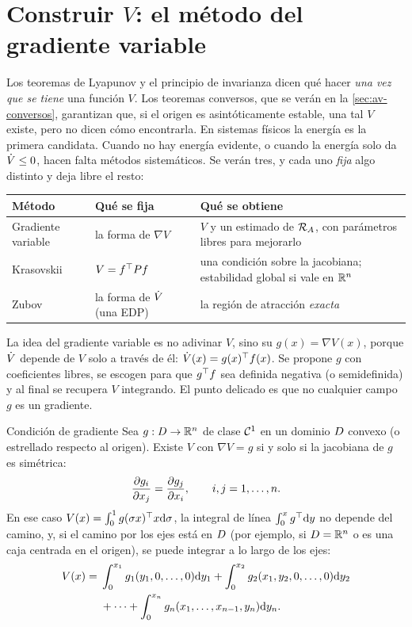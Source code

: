 \section{Construir $V$: el método del gradiente variable}
\label{sec:iv-gradiente}

Los teoremas de Lyapunov y el principio de invarianza dicen qué hacer \emph{una vez que se tiene} una función $V$. Los teoremas conversos, que se verán en la \cref{sec:av-conversos}, garantizan que, si el origen es asintóticamente estable, una tal $V$ existe, pero no dicen cómo encontrarla. En sistemas físicos la energía es la primera candidata. Cuando no hay energía evidente, o cuando la energía solo da $\dot V\le0$, hacen falta métodos sistemáticos. Se verán tres, y cada uno \emph{fija} algo distinto y deja libre el resto:

\begin{center}
\small
\begin{tabular}{@{}p{2.6cm}p{3.6cm}p{5.4cm}@{}}
\toprule
Método & Qué se fija & Qué se obtiene \\
\midrule
Gradiente variable & la forma de $\nabla V$ & $V$ y un estimado de $\mathcal{R}_A$, con parámetros libres para mejorarlo \\
Krasovskii & $V=f^{\top} Pf$ & una condición sobre la jacobiana; estabilidad global si vale en $\mathbb{R}^n$ \\
Zubov & la forma de $\dot V$ (una EDP) & la región de atracción \emph{exacta} \\
\bottomrule
\end{tabular}
\end{center}

La idea del gradiente variable es no adivinar $V$, sino su  $g(x)=\nabla V(x)$, porque $\dot V$ depende de $V$ solo a través de él: $\dot V(x)=g(x)^{\top} f(x)$. Se propone $g$ con coeficientes libres, se escogen para que $g^{\top} f$ sea definida negativa (o semidefinida) y al final se recupera $V$ integrando. El punto delicado es que no cualquier campo $g$ es un gradiente.

\begin{lema}[label=lem:iv-gradiente]{Condición de gradiente}
Sea $g:D\to\mathbb{R}^n$ de clase $\mathcal{C}^{1}$ en un dominio $D$ convexo (o estrellado respecto al origen). Existe $V$ con $\nabla V=g$ si y solo si la jacobiana de $g$ es simétrica:
\[
  \frac{\partial g_i}{\partial x_j}=\frac{\partial g_j}{\partial x_i},\qquad i,j=1,\dots,n .
\]
En ese caso $V(x)=\int_0^1g(\sigma x)^{\top} x\mathrm{d}\sigma$, la integral de línea $\int_0^xg^{\top}\mathrm{d} y$ no depende del camino, y, si el camino por los ejes está en $D$ (por ejemplo, si $D=\mathbb{R}^n$ o es una caja centrada en el origen), se puede integrar a lo largo de los ejes:
\[
  \begin{aligned}
  V(x)={}&\int_0^{x_1}g_1(y_1,0,\dots,0)\mathrm{d} y_1+\int_0^{x_2}g_2(x_1,y_2,0,\dots,0)\mathrm{d} y_2\\
  &+\cdots+\int_0^{x_n}g_n(x_1,\dots,x_{n-1},y_n)\mathrm{d} y_n .
  \end{aligned}
\]
\end{lema}


